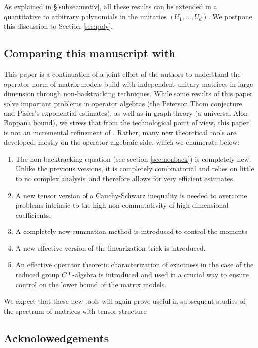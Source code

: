 \documentclass[11pt]{article}
\newcommand{\1}{1\!\!{\sf I}}
\begin{document}
As explained in \S \ref{subsec:motiv}, all these results can be extended in a quantitative to arbitrary polynomials in the unitaries $(U_1,\ldots,U_d)$. We postpone this discussion to Section \ref{sec:poly}.

\subsection*{Comparing this manuscript with \cite{MR4024563,BC2}}
This paper is a continuation of a joint effort of the authors to understand the operator norm of matrix models build with independent unitary matrices  in large dimension through non-backtracking techniques. 
While some results of this paper solve important problems in operator algebras (the Peterson Thom conjecture and Pisier's exponential estimates), as well as in graph theory  (a universal Alon Boppana bound), we stress that from the technological point of view, this paper is not an incremental refinement of  \cite{MR4024563,BC2}. Rather, many new theoretical tools are developed, mostly on the operator algebraic side, which we enumerate below:
\begin{enumerate}
\item The non-backtracking equation (see section \ref{sec:nonback}) is completely new. Unlike the previous versions, it is completely combinatorial and relies on little to no complex analysis, and therefore allows for very efficient estimates.
\item A new tensor version of a Cauchy-Schwarz inequality is needed to overcome problems intrinsic to the high non-commutativity of high dimensional coefficients. 
\item A completely new summation method is introduced to control the moments
\item A new effective version of the linearization trick is introduced. 
\item An effective operator theoretic characterization of exactness in the case of the reduced group $C*$-algebra is introduced and used in a crucial way to ensure control on the lower bound of the matrix models.  
\end{enumerate}
We expect that these new tools will again prove useful in subsequent studies of the spectrum of matrices with tensor structure 

\subsection*{Acknolowedgements}
\end{document}
